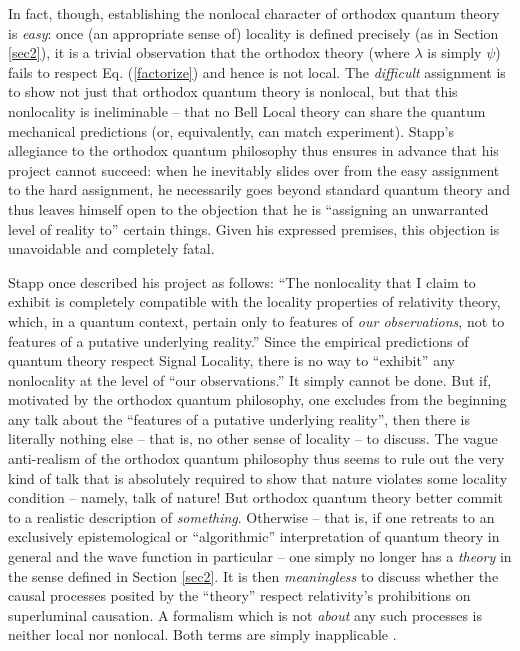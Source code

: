 \documentclass[aps,prc,onecolumn,12pt,nofootinbib]{revtex4-2}
\begin{document}
In fact, though, establishing the nonlocal character of
orthodox quantum theory is \emph{easy}:  once (an appropriate
sense of) locality is defined precisely (as in Section \ref{sec2}),
it is a trivial observation that the
orthodox theory (where $\lambda$ is simply $\psi$)
fails to respect Eq. (\ref{factorize}) and
hence is not local.  The \emph{difficult} assignment is to
show not just that orthodox quantum theory is nonlocal, but that this
nonlocality is ineliminable -- that no Bell Local theory can share the
quantum mechanical predictions (or, equivalently, can match experiment).
Stapp's allegiance to the orthodox quantum philosophy thus ensures in
advance that his project cannot succeed: when he inevitably slides over
from the easy assignment to the hard assignment, he necessarily goes
beyond standard quantum theory and thus leaves himself open to the
objection that he is ``assigning an unwarranted level of reality to''
certain things.  Given his expressed premises, this objection is
unavoidable and completely fatal.

Stapp once described his project as follows:
``The nonlocality that I claim to exhibit is
completely compatible with the locality properties of relativity
theory, which, in a quantum context, pertain only to features of
\emph{our observations}, not to features of a putative underlying
reality.'' \cite{stappresponse}
Since the empirical predictions of quantum
theory respect Signal Locality, there is no way to ``exhibit''
any nonlocality at the level of ``our observations.''  It simply
cannot be done.  But if, motivated by the orthodox quantum philosophy,
one excludes from the beginning any talk about the ``features of a
putative underlying reality'', then there is literally nothing else --
that is, no other sense of locality -- to discuss.
The vague anti-realism of
the orthodox quantum philosophy thus seems to rule out the
very kind of talk that is absolutely required to show that nature
violates some locality condition -- namely, talk of nature!
But orthodox quantum theory better commit to a realistic
description of \emph{something}.  Otherwise -- that is, if one retreats
to an exclusively epistemological or ``algorithmic''
interpretation of quantum theory in
general and the wave function in particular -- one simply no longer
has a \emph{theory} in the sense defined in Section \ref{sec2}.  It
is then \emph{meaningless} to discuss whether the causal
processes posited by the ``theory'' respect relativity's prohibitions
on superluminal causation.  A formalism which is not \emph{about} any
such processes
is neither local nor nonlocal.  Both terms are simply inapplicable \cite{boxes}.
\end{document}
